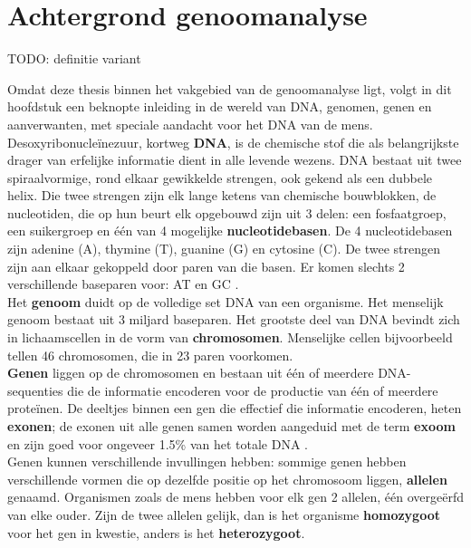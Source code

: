 \chapter{Achtergrond genoomanalyse}
\label{dna_dummies}

{\color{red} TODO: definitie variant}

Omdat deze thesis binnen het vakgebied van de genoomanalyse ligt, volgt in dit hoofdstuk een beknopte inleiding in de wereld van DNA, genomen, genen en aanverwanten, met speciale aandacht voor het DNA van de mens.\\

Desoxyribonucle\"inezuur, kortweg \textbf{DNA}, is de chemische stof die als belangrijkste drager van erfelijke informatie dient in alle levende wezens. DNA bestaat uit twee spiraalvormige, rond elkaar gewikkelde strengen, ook gekend als een dubbele helix. Die twee strengen zijn elk lange ketens van chemische bouwblokken, de nucleotiden, die op hun beurt elk opgebouwd zijn uit 3 delen: een fosfaatgroep, een suikergroep en \'e\'en van 4 mogelijke \textbf{nucleotidebasen}. De 4 nucleotidebasen zijn adenine (A), thymine (T), guanine (G) en cytosine (C). De twee strengen zijn aan elkaar gekoppeld door paren van die basen. Er komen slechts 2 verschillende baseparen voor: AT en GC \cite{genome_gov} \cite{nature_scitable}.\\

Het \textbf{genoom} duidt op de volledige set DNA van een organisme. Het menselijk genoom bestaat uit 3 miljard baseparen. Het grootste deel van DNA bevindt zich in lichaamscellen in de vorm van \textbf{chromosomen}. Menselijke cellen bijvoorbeeld tellen 46 chromosomen, die in 23 paren voorkomen.\\
\textbf{Genen} liggen op de chromosomen en bestaan uit \'e\'en of meerdere DNA-sequenties die de informatie encoderen voor de productie van \'e\'en of meerdere prote\"inen. De deeltjes binnen een gen die effectief die informatie encoderen, heten \textbf{exonen}; de exonen uit alle genen samen worden aangeduid met de term \textbf{exoom} en zijn goed voor ongeveer 1.5\% van het totale DNA \cite{broad_exome}.\\
Genen kunnen verschillende invullingen hebben: sommige genen hebben verschillende vormen die op dezelfde positie op het chromosoom liggen, \textbf{allelen} genaamd. Organismen zoals de mens hebben voor elk gen 2 allelen, \'e\'en overge\"erfd van elke ouder. Zijn de twee allelen gelijk, dan is het organisme \textbf{homozygoot} voor het gen in kwestie, anders is het \textbf{heterozygoot}.

